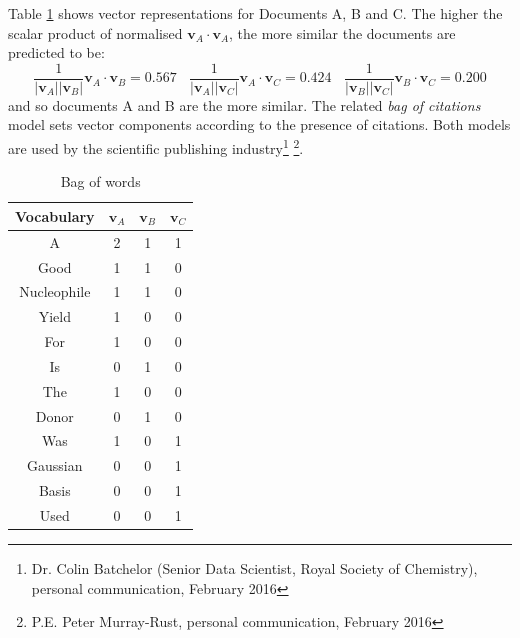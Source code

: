Table \ref{tab:BAGOFWORDS} shows vector representations for Documents A, B and C. The higher the scalar product of normalised $\mathbf{v}_A \cdot \mathbf{v}_A$, the more similar the documents are predicted to be:
 $$\frac{1}{|\mathbf{v}_A| |\mathbf{v}_B|}\mathbf{v}_A \cdot \mathbf{v}_B = 0.567 \ \ \ \ \frac{1}{|\mathbf{v}_A| |\mathbf{v}_C|}\mathbf{v}_A \cdot \mathbf{v}_C = 0.424 \ \ \ \ \frac{1}{|\mathbf{v}_B| |\mathbf{v}_C|}\mathbf{v}_B \cdot \mathbf{v}_C=0.200$$ 
and so documents A and B are the more similar.
The related \emph{bag of citations} model sets vector components according to the presence of citations. Both models are used by the scientific publishing industry\footnote{Dr. Colin Batchelor  (Senior Data Scientist, Royal Society of Chemistry), personal communication, February 2016} \footnote{P.E. Peter Murray-Rust, personal communication, February 2016}.
\newpage
\addtocounter{page}{-2}
\begin{table}[H]
\caption{Bag of words}
\label{tab:BAGOFWORDS}
\begin{center}
\begin{tabular}{||c|c|c|c||}
\hline
Vocabulary &  $\mathbf{v}_A$ & $\mathbf{v}_B$ & $\mathbf{v}_C$\\
\hline
A & 2 & 1 & 1\\
Good & 1 & 1 & 0\\
Nucleophile & 1 & 1 & 0 \\
Yield & 1 & 0 & 0\\
For & 1& 0 & 0\\
Is & 0 & 1 & 0\\
The & 1 & 0 & 0\\
Donor & 0 & 1 & 0\\
Was & 1 & 0 & 1\\
Gaussian & 0 & 0 & 1\\
Basis & 0 & 0 & 1\\
Used & 0 & 0 & 1\\
\hline
\end{tabular}
\end{center}
\end{table}
\newpage
\addtocounter{page}{1}
